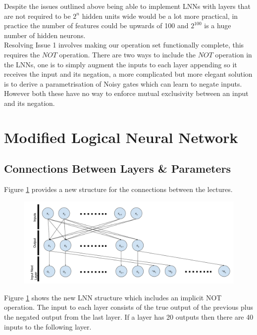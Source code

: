 Despite the issues outlined above being able to implement LNNs with layers that are not required to be $2^n$ hidden units wide would be a lot more practical, in practice the number of features could be upwards of 100 and $2^{100}$ is a huge number of hidden neurons.\\

Resolving Issue 1 involves making our operation set functionally complete, this requires the $NOT$ operation. There are two ways to include the $NOT$ operation in the LNNs, one is to simply augment the inputs to each layer appending so it receives the input and its negation, a more complicated but more elegant solution is to derive a parametrisation of Noisy gates which can learn to negate inputs. However both these have no way to enforce mutual exclusivity between an input and its negation.\\

\section{Modified Logical Neural Network} \label{sec:modified-lnn}
\subsection{Connections Between Layers \& Parameters}
Figure \ref{fig:modified-lnn-structure} provides a new structure for the connections between the lectures.

\begin{figure}[H]
	\centering
	\begin{minipage}[b]{0.9\textwidth}
		\includegraphics[width=\textwidth]{Modified-LNN-Structure.png}
		\caption{}
		\label{fig:modified-lnn-structure}
	\end{minipage}
	\hfill
\end{figure}


Figure \ref{fig:modified-lnn-structure} shows the new LNN structure which includes an implicit NOT operation. The input to each layer consists of the true output of the previous plus the negated output from the last layer. If a layer has 20 outputs then there are 40 inputs to the following layer.\\

